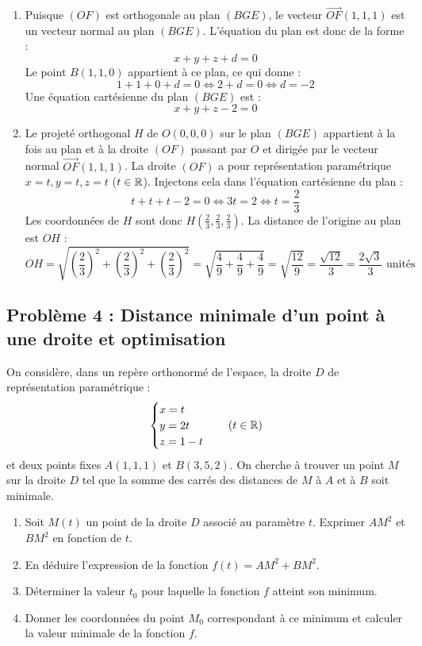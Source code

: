 \begin{enumerate}
    \item Puisque $(OF)$ est orthogonale au plan $(BGE)$, le vecteur $\vec{OF}(1, 1, 1)$ est un vecteur normal au plan $(BGE)$. L'équation du plan est donc de la forme :
    \[
    x + y + z + d = 0
    \]
    Le point $B(1, 1, 0)$ appartient à ce plan, ce qui donne :
    \[
    1 + 1 + 0 + d = 0 \iff 2 + d = 0 \iff d = -2
    \]
    Une équation cartésienne du plan $(BGE)$ est :
    \[
    x + y + z - 2 = 0
    \]
    
    \item Le projeté orthogonal $H$ de $O(0,0,0)$ sur le plan $(BGE)$ appartient à la fois au plan et à la droite $(OF)$ passant par $O$ et dirigée par le vecteur normal $\vec{OF}(1,1,1)$.
    La droite $(OF)$ a pour représentation paramétrique $x = t, y = t, z = t$ ($t \in \mathbb{R}$).
    Injectons cela dans l'équation cartésienne du plan :
    \[
    t + t + t - 2 = 0 \iff 3t = 2 \iff t = \frac{2}{3}
    \]
    Les coordonnées de $H$ sont donc $H\left(\frac{2}{3}, \frac{2}{3}, \frac{2}{3}\right)$.
    La distance de l'origine au plan est $OH$ :
    \[
    OH = \sqrt{\left(\frac{2}{3}\right)^2 + \left(\frac{2}{3}\right)^2 + \left(\frac{2}{3}\right)^2} = \sqrt{\frac{4}{9} + \frac{4}{9} + \frac{4}{9}} = \sqrt{\frac{12}{9}} = \frac{\sqrt{12}}{3} = \frac{2\sqrt{3}}{3} \text{ unités}
    \]
\end{enumerate}

\subsection*{Problème 4 : Distance minimale d'un point à une droite et optimisation}
On considère, dans un repère orthonormé de l'espace, la droite $D$ de représentation paramétrique :
\[
\begin{cases}
x = t \\
y = 2t \\
z = 1 - t
\end{cases} \quad (t \in \mathbb{R})
\]
et deux points fixes $A(1, 1, 1)$ et $B(3, 5, 2)$. On cherche à trouver un point $M$ sur la droite $D$ tel que la somme des carrés des distances de $M$ à $A$ et à $B$ soit minimale.
\begin{enumerate}
    \item Soit $M(t)$ un point de la droite $D$ associé au paramètre $t$. Exprimer $AM^2$ et $BM^2$ en fonction de $t$.
    \item En déduire l'expression de la fonction $f(t) = AM^2 + BM^2$.
    \item Déterminer la valeur $t_0$ pour laquelle la fonction $f$ atteint son minimum.
    \item Donner les coordonnées du point $M_0$ correspondant à ce minimum et calculer la valeur minimale de la fonction $f$.
\end{enumerate}

